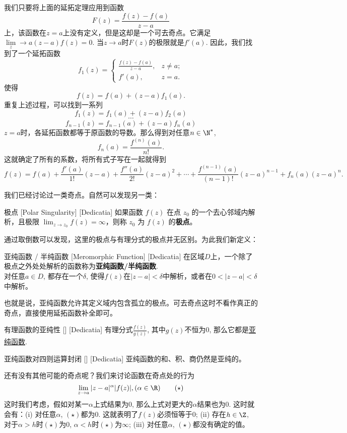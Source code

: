 \documentclass[UTF8]{ctexart}
\newcommand{\MeromorphicFunction}{\hyperref[dfn:MeromorphicFunction]{亚纯函数}}
\begin{document}
\begin{prf}
    我们只要将上面的延拓定理应用到函数
    \[F(z)=\frac{f(z)-f(a)}{z-a}\]
    上，该函数在$z=a$上没有定义，但是这却是一个可去奇点。它满足$\lim\limits_z\to a(z-a)f(z)=0$. 当$z\to a$时$F(z)$的极限就是$f'(a)$. 因此，我们找到了一个延拓函数
    \[f_1(z)=\begin{cases}
        \frac{f(z)-f(a)}{z-a}, & z\neq a;\\
        f'(a), &z=a.
    \end{cases}\]
    使得
    \[f(z)=f(a)+(z-a)f_1(a).\]
    重复上述过程，可以找到一系列
    \[f_1(z)=f_1(a)+(z-a)f_2(a)\]
    \[\cdots\]
    \[f_{n-1}(z)=f_{n-1}(a)+(z-a)f_n(a)\]
    $z=a$时，各延拓函数都等于原函数的导数。那么得到对任意$n\in\N^*$,
    \[f_n(a)=\frac{f^{(n)}(a)}{n!}.\]
    这就确定了所有的系数，将所有式子写在一起就得到
    \[f(z)=f(a)+\frac{f'(a)}{1!}(z-a)+\frac{f''(a)}{2!}(z-a)^2+\cdots+\frac{f^{(n-1)}(a)}{(n-1)!}(z-a)^{n-1}+f_n(a)(z-a)^n.\]
\end{prf}
我们已经讨论过一类奇点。自然可以发现另一类：
\begin{dfn}
    [UUID]
    {极点}
    [Polar Singularity]
    [Dedicatia]
    如果函数 \( f(z) \) 在点 \( z_0 \) 的一个去心邻域内解析，且极限 \( \lim_{z \to z_0} f(z) = \infty \)，则称 \( z_0 \) 为 \( f(z) \) 的\textbf{极点}。
\end{dfn}
通过取倒数可以发现，这里的极点与有理分式的极点并无区别。为此我们新定义：
\begin{dfn}
    [UUID]
    {亚纯函数 / 半纯函数\label{dfn:MeromorphicFunction}}
    [Meromorphic Function]
    [Dedicatia]
    在区域$D$上，一个除了极点之外处处解析的函数称为\textbf{亚纯函数/半纯函数}.\\
    对任意$a\in D$, 都存在一个$\delta$, 使得$f(z)$在$|z-a|<\delta$中解析，或者在$0<|z-a|<\delta$中解析。
\end{dfn}
也就是说，亚纯函数允许其定义域内包含孤立的极点。可去奇点这时不看作真正的奇点，直接使用延拓函数补全即可。
\begin{crl}
    [UUID]
    {有理函数的亚纯性}
    []
    [Dedicatia]
    有理分式$\frac{f(z)}{g(z)}$, 其中$g(z)$不恒为0, 那么它都是\MeromorphicFunction.
\end{crl}
\begin{ppt}
    [UUID]
    {亚纯函数对四则运算封闭}
    []
    [Dedicatia]
    亚纯函数的和、积、商仍然是亚纯的。
\end{ppt}
还有没有其他可能的奇点呢？我们来讨论函数在奇点处的行为
\[\lim_{z\to a}|z-a|^\alpha |f(z)|, (\alpha\in\R)\tag{$\star$}\]
这时我们考虑，假如对某一$\alpha$上式结果为0, 那么上式对更大的$\alpha$结果也为0. 这时就会有：(i) 对任意$\alpha$, $(\star)$都为0. 这就表明了$f(z)$必须恒等于0; (ii) 存在$h\in\Z$, 对于$\alpha>h$时$(\star)$为0, $\alpha<h$时$(\star)$为$\infty$; (iii) 对任意$\alpha$, $(\star)$都没有确定的值。\\
\end{document}
